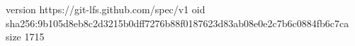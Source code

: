 version https://git-lfs.github.com/spec/v1
oid sha256:9b105d8eb8c2d3215b0dff7276b88f0187623d83ab08e0e2c7b6c0884fb6c7ca
size 1715
